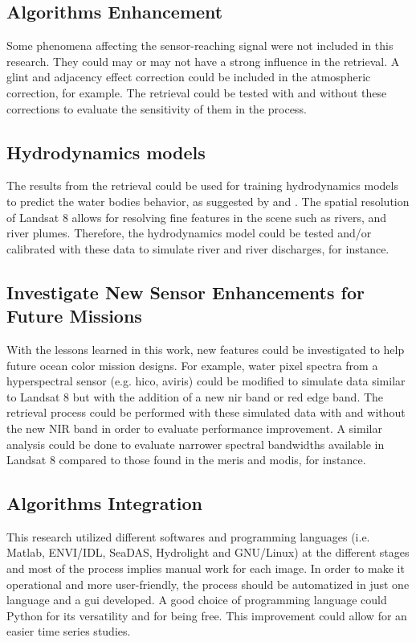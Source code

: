 \subsection{Algorithms Enhancement} 
Some phenomena affecting the sensor-reaching signal were not included in this research. They could may or may not have a strong influence in the retrieval. A glint and adjacency effect correction could be included in the atmospheric correction, for example. The retrieval could be tested with and without these corrections to evaluate the sensitivity of them in the process.

\subsection{Hydrodynamics models} 
The results from the retrieval could be used for training hydrodynamics models to predict the water bodies behavior, as suggested by \cite{Pahlevan:2012} and \cite{GeraceThesis}. The spatial resolution of Landsat 8 allows for resolving fine features in the scene such as rivers, and river plumes. Therefore, the hydrodynamics model could be tested and/or calibrated with these data to simulate river and river discharges, for instance.

\subsection{Investigate New Sensor Enhancements for Future Missions}
With the lessons learned in this work, new features could be investigated to help future ocean color mission designs. For example, water pixel spectra from a hyperspectral sensor (e.g. \gls{hico}, \gls{aviris}) could be modified to simulate data similar to Landsat 8 but with the addition of a new \gls{nir} band or red edge band. The retrieval process could be performed with these simulated data with and without the new NIR band in order to evaluate performance improvement. A similar analysis could be done to evaluate narrower spectral bandwidths available in Landsat 8 compared to those found in the \gls{meris} and \gls{modis}, for instance. 

\subsection{Algorithms Integration}
This research utilized different softwares and programming languages (i.e. Matlab, ENVI/IDL, SeaDAS, Hydrolight and GNU/Linux) at the different stages and most of the process implies manual work for each image. In order to make it operational and more user-friendly, the process should be automatized in just one language and a \gls{gui} developed. A good choice of programming language could Python for its versatility and for being free. This improvement could allow for an easier time series studies.

